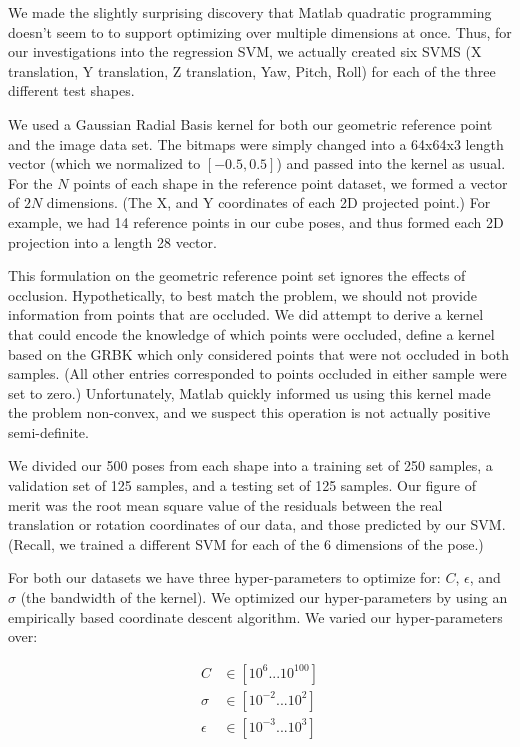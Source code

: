 \documentclass[journal]{IEEEtran}
\begin{document}
We made the slightly surprising discovery that Matlab quadratic programming doesn't seem to to support optimizing over multiple dimensions at once. Thus, for our investigations into the regression SVM, we actually created six SVMS (X translation, Y translation, Z translation, Yaw, Pitch, Roll) for each of the three different test shapes.

We used a Gaussian Radial Basis kernel for both our geometric reference point and the image data set. The bitmaps were simply changed into a 64x64x3 length vector (which we normalized to $[-0.5, 0.5]$) and passed into the kernel as usual. For the $N$ points of each shape in the reference point dataset, we formed a vector of $2N$ dimensions. (The X, and Y coordinates of each 2D projected point.)  For example, we had 14 reference points in our cube poses, and thus formed each 2D projection into a length 28 vector.

This formulation on the geometric reference point set ignores the effects of occlusion. Hypothetically, to best match the problem, we should not provide information from points that are occluded. We did attempt to derive a kernel that could encode the knowledge of which points were occluded, define a kernel based on the GRBK which only considered points that were not occluded in both samples. (All other entries corresponded to points occluded in either sample were set to zero.)
Unfortunately, Matlab quickly informed us using this kernel made the problem non-convex, and we suspect this operation is not actually positive semi-definite.

We divided our 500 poses from each shape into a training set of 250 samples, a validation set of 125 samples, and a testing set of 125 samples. Our figure of merit was the root mean square value of the residuals between the real translation or rotation coordinates of our data, and those predicted by our SVM. (Recall, we trained a different SVM for each of the 6 dimensions of the pose.)

For both our datasets we have three hyper-parameters to optimize for: $C$, $\epsilon$, and $\sigma$ (the bandwidth of the kernel). We optimized our hyper-parameters by using an empirically based coordinate descent algorithm. We varied our hyper-parameters over:

\begin{align*}
C &\in [10^{6} ... 10^{100}]\\
\sigma &\in [10^{-2} ... 10^{2}]\\
\epsilon &\in [10^{-3} ... 10^{3}]
\end{align*}
\end{document}
